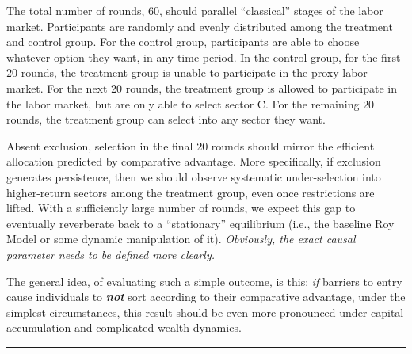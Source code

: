 \documentclass[17pt]{extarticle}  %
\begin{document}

The total number of rounds, $60$, should parallel \enquote{classical} stages of the labor market. 
Participants are randomly and evenly distributed among the treatment and control group. For the control group, participants are able to choose whatever option they want, in any time period. In the control group, for the first $20$ rounds, the treatment group is unable to participate in the proxy labor market. For the next $20$ rounds, the treatment group is allowed to participate in the labor market, but are only able to select sector C. For the remaining $20$ rounds, the treatment group can select into any sector they want. 

Absent exclusion, selection in the final 20 rounds should mirror the efficient allocation predicted by comparative advantage. More specifically, if exclusion generates persistence, then we should observe systematic under-selection into higher-return sectors among the treatment group, even once restrictions are lifted. With a sufficiently large number of rounds, we expect this gap to eventually reverberate back to a \enquote{stationary} equilibrium (i.e., the baseline Roy Model or some dynamic manipulation of it). \emph{Obviously, the exact causal parameter needs to be defined more clearly.}

The general idea, of evaluating such a simple outcome, is this: \emph{if} barriers to entry cause individuals to \textbf{\emph{not}} sort according to their comparative advantage, under the simplest circumstances, this result should be even more pronounced under capital accumulation and complicated wealth dynamics.


\noindent\rule{\linewidth}{0.4pt}
\end{document}

